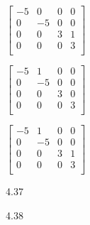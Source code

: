 \documentclass[12pt]{article}
\newenvironment{problems}{\begin{list}{}{\setlength{\labelwidth}{.7in}}}{\end{list}}
\begin{document}
\begin{problems}
    $\begin{bmatrix}
   -5 & 0  & 0 & 0 \\
   0  & -5 & 0 & 0 \\
   0  & 0  & 3 & 1 \\
   0  & 0  & 0 & 3 \\
  \end{bmatrix} 
  $
  
    $\begin{bmatrix}
   -5 & 1  & 0 & 0 \\
   0  & -5 & 0 & 0 \\
   0  & 0  & 3 & 0 \\
   0  & 0  & 0 & 3 \\
  \end{bmatrix} 
  $
  
    $\begin{bmatrix}
   -5 & 1  & 0 & 0 \\
   0  & -5 & 0 & 0 \\
   0  & 0  & 3 & 1 \\
   0  & 0  & 0 & 3 \\
  \end{bmatrix} 
  $

  
  \item[4.37]
  
  \item[4.38]
  
  
  
\end{problems}
 
\end{document}
